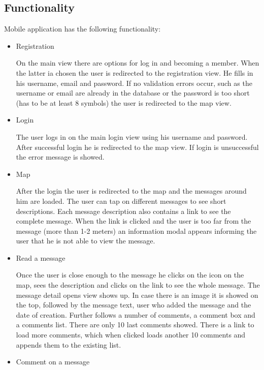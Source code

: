 \documentclass[thesis=M,english]{FITthesis}[2012/10/20]
\begin{document}
\subsection{Functionality}

Mobile application has the following functionality:

\begin{itemize}

	\item Registration
	
	On the main view there are options for log in and becoming a member. When the latter ia chosen the user is redirected to the registration view. He fills in his username, email and password. If no validation errors occur, such as the username or email are already in the database or the password is too short (has to be at least 8 symbols) the user is redirected to the map view.
	
	\item Login
	
	The user logs in on the main login view using his username and password. After successful login he is redirected to the map view. If login is unsuccessful the error message is showed.
	
	\item Map
	
	After the login the user is redirected to the map and the messages around him are loaded. The user can tap on different messages to see short descriptions. Each message description also contains a link to see the complete message. When the link is clicked and the user is too far from the message (more than 1-2 meters) an information modal appears informing the user that he is not able to view the message.
	
	\item Read a message
	
	Once the user is close enough to the message he clicks on the icon on the map, sees the description and clicks on the link to see the whole message. The message detail opens view shows up. In case there is an image it is showed on the top, followed by the message text, user who added the message and the date of creation. Further follows a number of comments, a comment box and a comments list. There are only 10 last comments showed. There is a link to load more comments, which when clicked loads another 10 comments and appends them to the existing list.
	
	\item Comment on a message
	

\end{itemize}
\end{document}

